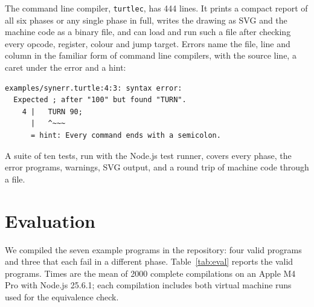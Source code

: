 \documentclass[conference]{IEEEtran}
\newcommand{\code}[1]{\texttt{#1}}
\begin{document}
The command line compiler, \code{turtlec}, has 444 lines. It prints a compact report of all six phases or any single phase in full, writes the drawing as SVG and the machine code as a binary file, and can load and run such a file after checking every opcode, register, colour and jump target. Errors name the file, line and column in the familiar form of command line compilers, with the source line, a caret under the error and a hint:

\begin{lstlisting}[style=plain]
examples/synerr.turtle:4:3: syntax error:
  Expected ; after "100" but found "TURN".
    4 |   TURN 90;
      |   ^~~~
      = hint: Every command ends with a semicolon.
\end{lstlisting}

A suite of ten tests, run with the Node.js test runner, covers every phase, the error programs, warnings, SVG output, and a round trip of machine code through a file.

\section{Evaluation}

We compiled the seven example programs in the repository: four valid programs and three that each fail in a different phase. Table~\ref{tab:eval} reports the valid programs. Times are the mean of 2000 complete compilations on an Apple M4 Pro with Node.js 25.6.1; each compilation includes both virtual machine runs used for the equivalence check.

\begin{table}[t]
\caption{Results on the four valid example programs. Tokens include the end marker; instructions are three address instructions without labels; steps are virtual machine steps.}
\label{tab:eval}
\centering
\footnotesize
\setlength{\tabcolsep}{3.2pt}
\end{table}
\end{document}
